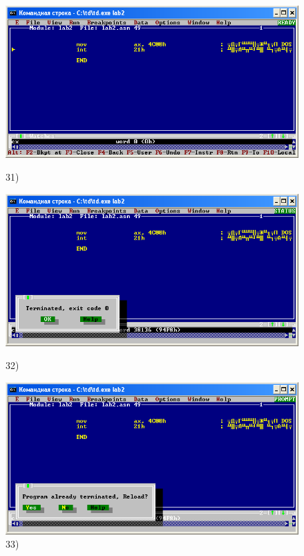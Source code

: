 \begin{figure}[!htp]
    \centering
    \begin{minipage}{0.32\textwidth}
        \centering
        \includegraphics[width=.99\linewidth]
            {../_INCLUDES/task-4-14/31.png}
        \caption{31) }
        \label{fig:task_4_14__31}
    \end{minipage}
    \begin {minipage}{0.32\textwidth}
        \centering
        \includegraphics[width=.99\linewidth]
            {../_INCLUDES/task-4-14/32.png}
        \caption{32) }
        \label{fig:task_4_14__32}
    \end{minipage}
    \begin {minipage}{0.32\textwidth}
        \centering
        \includegraphics[width=.99\linewidth]
            {../_INCLUDES/task-4-14/33.png}
        \caption{33) }
        \label{fig:task_4_14__33}
    \end{minipage}
\end{figure}


